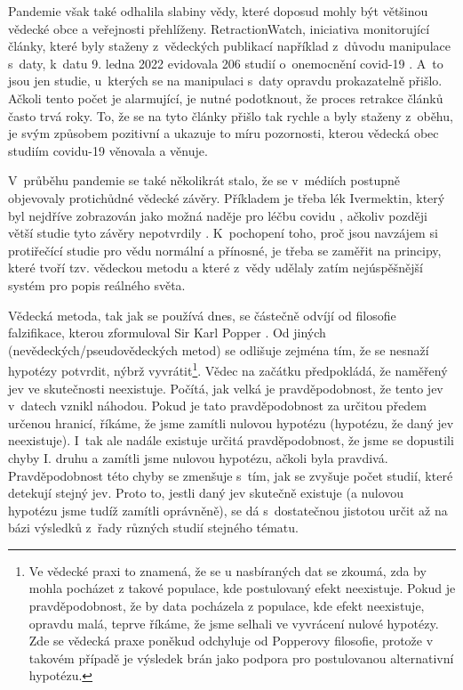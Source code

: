 Pandemie však také odhalila slabiny vědy, které doposud mohly být většinou vědecké obce a veřejnosti přehlíženy. RetractionWatch, iniciativa monitorující články, které byly staženy z~vědeckých publikací například z~důvodu manipulace s~daty, k~datu 9. ledna 2022 evidovala 206 studií o~onemocnění covid-19 \cite{RetractionWatch}. A~to jsou jen studie, u~kterých se na manipulaci s~daty opravdu prokazatelně přišlo. Ačkoli tento počet je alarmující, je nutné podotknout, že proces retrakce článků často trvá roky. To, že se na tyto články přišlo tak rychle a byly staženy z~oběhu, je svým způsobem pozitivní a ukazuje to míru pozornosti, kterou vědecká obec studiím covidu-19 věnovala a věnuje.

V~průběhu pandemie se také několikrát stalo, že se v~médiích postupně objevovaly protichůdné vědecké závěry. Příkladem je třeba lék Ivermektin, který byl nejdříve zobrazován jako možná naděje pro léčbu covidu \cite{Ceskatelevize2020}, ačkoliv později větší studie tyto závěry nepotvrdily \cite{Lopez-Medina2021}. K~pochopení toho, proč jsou navzájem si protiřečící studie pro vědu normální a přínosné, je třeba se zaměřit na principy, které tvoří tzv. vědeckou metodu a které z~vědy udělaly zatím nejúspěšnější systém pro popis reálného světa.

Vědecká metoda, tak jak se používá dnes, se částečně odvíjí od filosofie falzifikace, kterou zformuloval Sir Karl Popper \cite{Popper2002}. Od jiných (ne\-vě\-de\-ckých/pseu\-do\-vě\-de\-ckých metod) se odlišuje zejména tím, že se nesnaží hypotézy potvrdit, nýbrž vyvrátit\footnote{Ve vědecké praxi to znamená, že se u nasbíraných dat se zkoumá, zda by mohla pocházet z takové populace, kde postulovaný efekt neexistuje. Pokud je pravděpodobnost, že by data pocházela z populace, kde efekt neexistuje, opravdu malá, teprve říkáme, že jsme selhali ve vyvrácení nulové hypotézy. Zde se vědecká praxe poněkud odchyluje od Popperovy filosofie, protože v takovém případě je výsledek brán jako podpora pro postulovanou alternativní hypotézu.}. Vědec na začátku předpokládá, že naměřený jev ve skutečnosti neexistuje. Počítá, jak velká je pravděpodobnost, že tento jev v~datech vznikl náhodou. Pokud je tato pravděpodobnost za určitou předem určenou hranicí, říkáme, že jsme zamítli nulovou hypotézu (hypotézu, že daný jev neexistuje). I~tak ale nadále existuje určitá pravděpodobnost, že jsme se dopustili chyby I. druhu a zamítli jsme nulovou hypotézu, ačkoli byla pravdivá. Pravděpodobnost této chyby se zmenšuje s~tím, jak se zvyšuje počet studií, které detekují stejný jev. Proto to, jestli daný jev skutečně existuje (a nulovou hypotézu jsme tudíž zamítli oprávněně), se dá s~dostatečnou jistotou určit až na bázi výsledků z~řady různých studií stejného tématu.

